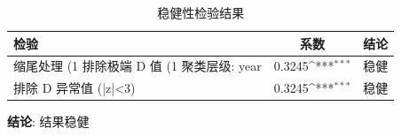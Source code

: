 \begin{table}[htbp]
\centering
\caption{稳健性检验结果}
\label{tab:robustness}
\def\sym#1{\ifmmode^{#1}\else\(^{#1}\)\fi}
\begin{tabular}{lcc}
\toprule
检验 & 系数 & 结论 \\
\midrule
缩尾处理 (1%
排除极端 D 值 (1%
聚类层级: year & 0.3245\sym{***} & 稳健 \\
排除 D 异常值 (|z|<3) & 0.3245\sym{***} & 稳健 \\
\bottomrule
\end{tabular}
\end{table}

\textbf{结论}: 结果稳健
